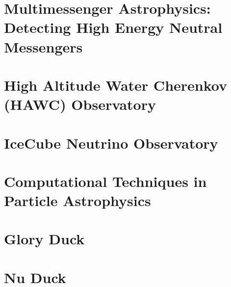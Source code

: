 \documentclass[PhD]{msu-thesis}
\begin{document}
\chapter{Multimessenger Astrophysics: Detecting High Energy Neutral Messengers\label{sec:multmessenger}}


\chapter{High Altitude Water Cherenkov (HAWC) Observatory\label{sec:hawc}}


\chapter{IceCube Neutrino Observatory\label{sec:ice3}}


\chapter{Computational Techniques in Particle Astrophysics}


\chapter{Glory Duck\label{sec:glory_duck}}


\chapter{Nu Duck\label{sec:nu_duck}}

\backmatter
\SingleSpacing
\printbibliography
\end{document}
